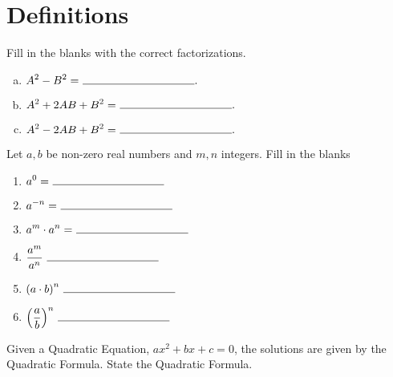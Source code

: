 \documentclass[12pt]{amsart}
\begin{document}
\section{Definitions}
\begin{thm}[3 Points]\label{ex1}
  Fill in the blanks with the correct factorizations.
  \begin{enumerate}[(a)]
  \item
    $\displaystyle{A^2 - B^2 =\ \line(1,0){100}}.$
    \vspace{.3in}
  \item
    $\displaystyle{A^2 + 2AB + B^2 =\ \line(1,0){100}}.$
    \vspace{.3in}
  \item
    $\displaystyle{A^2 - 2AB + B^2 =\ \line(1,0){100}}.$
    \vspace{.3in}
  \end{enumerate}
\end{thm}
\vspace{.5in}
\begin{thm}[6 Points]\label{ex2}
  Let $a, b$ be non-zero real numbers and $m, n$ integers.
  Fill in the blanks
  \vspace{.25in}
  \begin{multicols}{2}
    \begin{enumerate}
    \item
      $\displaystyle{a^0 =\ \line(1,0){100}}$
      \vspace{.4in}
    \item
      $\displaystyle{a^{-n} =\ \line(1,0){100}}$
      \vspace{.3in}
    \item
      $\displaystyle{a^m \cdot a^n =\ \line(1,0){100}}$
    \item
      $\displaystyle{\frac{a^m}{a^n}\ \line(1,0){100}}$
      \vspace{.25in}
    \item
      $\displaystyle{\left(a \cdot b\right)^n\ \line(1,0){100}}$
      \vspace{.25in}
    \item
      $\displaystyle{\left(\frac{a}{b}\right)^n\ \line(1,0){100}}$
    \end{enumerate}
  \end{multicols}
\end{thm}
\vspace{.5in}
\begin{thm}[2 Points]\label{ex3}
  Given a Quadratic Equation, $ax^2 + bx + c = 0$, the solutions are given by the Quadratic Formula.  State the Quadratic Formula.
  \vspace{1in}
\end{thm}
\end{document}
